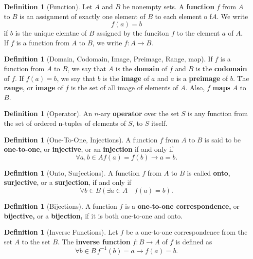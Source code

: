 \documentclass[12pt,a4paper]{report}
\theoremstyle{definition}
\newtheorem{definition}[theorem]{Definition}
\theoremstyle{remark}
\begin{document}
\begin{definition}[Function]
    Let $A$ and $B$ be nonempty sets. A \textbf{function} $f$ from $A$ to $B$ is an assignment of exactly one element of $B$ to each element o f$A$. We write \[f(a) = b\] if $b$ is the unique elemtne of $B$ assigned by the funciton $f$ to the element $a$ of $A$. If $f$ is a function from $A$ to $B$, we write $f:A \to B$.
\end{definition}

\begin{definition}[Domain, Codomain, Image, Preimage, Range, map]
    If $f$ is a function from $A$ to $B$, we say that $A$ is the \textbf{domain} of $f$ and $B$ is the \textbf{codomain} of $f$. If $f(a) = b$, we say that $b$ is the \textbf{image} of $a$ and $a$ is a \textbf{preimage} of $b$. The \textbf{range}, or \textbf{image} of $f$ is the set of all image of elements of $A$. Also, $f$ \textbf{maps} $A$ to $B$.
\end{definition}

\begin{definition}[Operator]
    An $n$-ary \textbf{operator} over the set $S$ is any function from the set of ordered n-tuples of elements of $S$, to $S$ itself.
\end{definition}

\begin{definition}[One-To-One, Injections]
    A function $f$ from $A$ to $B$ is said to be \textbf{one-to-one}, or \textbf{injective}, or an \textbf{injection} if and only if 
    \[\forall a, b \in A f(a) = f(b) \to a = b.\]
\end{definition}

\begin{definition}[Onto, Surjections]
    A function $f$ from $A$ to $B$ is called \textbf{onto}, \textbf{surjective}, or a \textbf{surjection}, if and only if 
    \[\forall b \in B(\exists a \in A \quad f(a) = b).\]
\end{definition}

\begin{definition}[Bijections]
    A function $f$ is a \textbf{one-to-one correspondence,} or \textbf{bijective,} or a \textbf{bijection,} if it is both one-to-one and onto.
\end{definition}

\begin{definition}[Inverse Functions]
    Let $f$ be a one-to-one correspondence from the set $A$ to the set $B$. The \textbf{inverse function} $f:B \to A$ of $f$ is defined as
    \[\forall b \in B \, f^{-1}(b) = a \to f(a) = b.\]
\end{definition}
\end{document}
